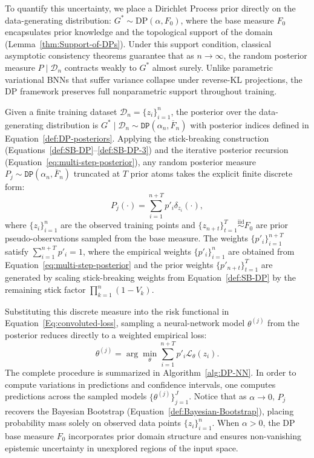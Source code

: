 \documentclass[10pt]{article}
\newcommand{\DP}{\texttt{DP}}
\begin{document}
To quantify this uncertainty, we place a Dirichlet Process prior directly on the data-generating distribution: $G^* \sim \mathrm{DP}(\alpha, F_0)$, where the base measure $F_0$ encapsulates prior knowledge and the topological support of the domain (Lemma~\ref{thm:Support-of-DPs}). Under this support condition, classical asymptotic consistency theorems \citep{ferguson1973bayesian, ghosal2010dirichlet} guarantee that as $n \to \infty$, the random posterior measure $P \mid \mathcal{D}_n$ contracts weakly to $G^*$ almost surely. Unlike parametric variational BNNs that suffer variance collapse under reverse-KL projections, the DP framework preserves full nonparametric support throughout training.

Given a finite training dataset $\mathcal{D}_n = \{z_i\}_{i=1}^n$, the posterior over the data-generating distribution is $G^* \mid \mathcal{D}_n \sim \DP(\alpha_n, \overline{F}_n)$ with posterior indices defined in Equation~\eqref{def:DP-posteriors}. Applying the stick-breaking construction (Equations~\eqref{def:SB-DP}--\eqref{def:SB-DP-3}) and the iterative posterior recursion (Equation~\eqref{eq:multi-step-posterior}), any random posterior measure $P_j \sim \DP(\alpha_n, \overline{F}_n)$ truncated at $T$ prior atoms takes the explicit finite discrete form:
\begin{equation}\label{Eq:Stick-Breaking-priors-Ch4-Pj}
P_j(\cdot) = \sum_{i=1}^{n+T} p'_i \delta_{z_i}(\cdot),
\end{equation}
where $\{z_i\}_{i=1}^n$ are the observed training points and $\{z_{n+t}\}_{t=1}^T \stackrel{\mathrm{iid}}{\sim} F_0$ are prior pseudo-observations sampled from the base measure. The weights $\{p'_i\}_{i=1}^{n+T}$ satisfy $\sum_{i=1}^{n+T} p'_i = 1$, where the empirical weights $\{p'_i\}_{i=1}^n$ are obtained from Equation~\eqref{eq:multi-step-posterior} and the prior weights $\{p'_{n+t}\}_{t=1}^T$ are generated by scaling stick-breaking weights from Equation~\eqref{def:SB-DP} by the remaining stick factor $\prod_{k=1}^n (1 - V_k)$.

Substituting this discrete measure into the risk functional in Equation~\eqref{Eq:convoluted-loss}, sampling a neural-network model $\theta^{(j)}$ from the posterior reduces directly to a weighted empirical loss:
\begin{equation}\label{eq:coovoluted-loss-Pj}
\theta^{(j)} = \arg \min_{\theta} \sum_{i=1}^{n+T} p'_i \mathcal{L}_{\theta}(z_i).
\end{equation}
The complete procedure is summarized in Algorithm~\ref{alg:DP-NN}. In order to compute variations in predictions and confidence intervals, one computes predictions across the sampled models $\{\theta^{(j)}\}_{j=1}^J$. Notice that as $\alpha \to 0$, $P_j$ recovers the Bayesian Bootstrap (Equation~\eqref{def:Bayesian-Bootstrap}), placing probability mass solely on observed data points $\{z_i\}_{i=1}^n$. When $\alpha > 0$, the DP base measure $F_0$ incorporates prior domain structure and ensures non-vanishing epistemic uncertainty in unexplored regions of the input space.
\end{document}
